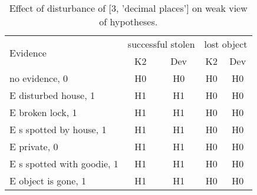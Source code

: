 \begin{table}\begin{tabular}{l|cc|cc}\toprule\multirow{2}{*}{Evidence} & \multicolumn{2}{c}{successful stolen}& \multicolumn{2}{c}{lost object}\\& {K2} & {Dev}& {K2} & {Dev}\\\midrule
no evidence, 0 & H0&H0&H0&H0\\E disturbed house, 1 & H1&H1&H0&H0\\E broken lock, 1 & H1&H1&H0&H0\\E s spotted by house, 1 & H1&H1&H0&H0\\E private, 0 & H1&H1&H0&H0\\E s spotted with goodie, 1 & H1&H1&H0&H0\\E object is gone, 1 & H1&H1&H0&H0\\\bottomrule\end{tabular}\caption{Effect of disturbance of [3, 'decimal places'] on weak view of hypotheses.}\end{table}